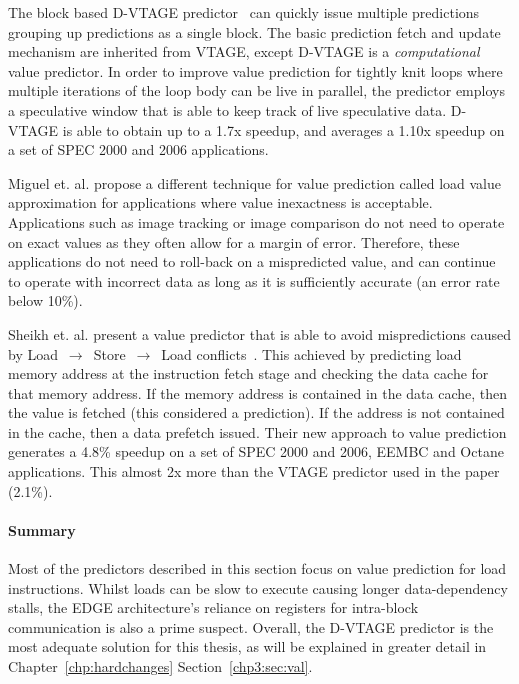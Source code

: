 The block based D-VTAGE predictor~\cite{peraisBeBop2015} can quickly issue multiple predictions grouping up predictions as a single block.
The basic prediction fetch and update mechanism are inherited from VTAGE, except D-VTAGE is a \textit{computational} value predictor.
In order to improve value prediction for tightly knit loops where multiple iterations of the loop body can be live in parallel, the predictor employs a speculative window that is able to keep track of live speculative data.
D-VTAGE is able to obtain up to a 1.7x speedup, and averages a 1.10x speedup on a set of SPEC 2000 and 2006 applications. 

Miguel et. al. propose a different technique for value prediction called load value approximation \cite{miguel2014LoadVal} for applications where value inexactness is acceptable.
Applications such as image tracking or image comparison do not need to operate on exact values as they often allow for a margin of error.
Therefore, these applications do not need to roll-back on a mispredicted value, and can continue to operate with incorrect data as long as it is sufficiently accurate (an error rate below 10\%).

Sheikh et. al. present a value predictor that is able to avoid mispredictions caused by Load $\,\to\,$ Store $\,\to\,$ Load conflicts~\cite{sheikh2017value}.
This achieved by predicting load memory address at the instruction fetch stage and checking the data cache for that memory address.
If the memory address is contained in the data cache, then the value is fetched (this considered a prediction).
If the address is not contained in the cache, then a data prefetch issued.
Their new approach to value prediction generates a 4.8\% speedup on a set of SPEC 2000 and 2006, EEMBC and Octane applications.
This almost 2x more than the VTAGE predictor used in the paper (2.1\%).

\paragraph*{Summary}
Most of the predictors described in this section focus on value prediction for load instructions.
Whilst loads can be slow to execute causing longer data-dependency stalls, the EDGE architecture's reliance on registers for intra-block communication is also a prime suspect.
Overall, the D-VTAGE predictor is the most adequate solution for this thesis, as will be explained in greater detail in Chapter~\ref{chp:hardchanges} Section~\ref{chp3:sec:val}.

